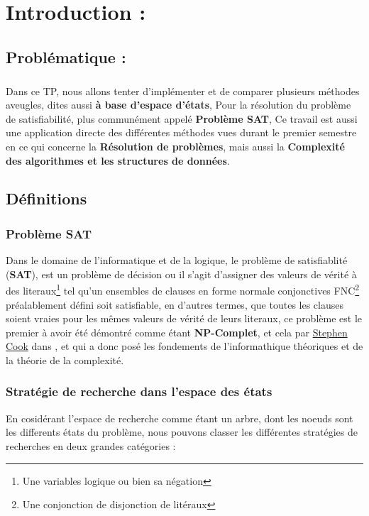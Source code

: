 \documentclass[12pt]{report}
\begin{document}
 
\tableofcontents

\newpage
\chapter{Introduction : }
\section{Problématique : }
\paragraph{}
Dans ce TP, nous allons tenter d'implémenter et de comparer plusieurs méthodes aveugles, dites aussi \textbf{à base d'espace d'états}, Pour la résolution du problème de satisfiabilité, plus communément appelé \textbf{Problème SAT}, Ce travail est aussi une application directe des différentes méthodes vues durant le premier semestre en ce qui concerne la \textbf{Résolution de problèmes}, mais aussi la \textbf{Complexité des algorithmes et les structures de données}.
\section{Définitions}
\subsection{Problème SAT}
Dans le domaine de l'informatique et de la logique, le problème de satisfiablité (\textbf{SAT}), est un problème de décision ou il s'agit d'assigner des valeurs de vérité à des literaux\footnote{Une variables logique ou bien sa négation} tel qu'un ensembles de clauses en forme normale conjonctives FNC\footnote{Une conjonction de disjonction de litéraux} préalablement défini soit satisfiable, en d'autres termes, que toutes les clauses soient vraies pour les mêmes valeurs de vérité de leurs literaux, ce problème est le premier à avoir été démontré comme étant \textbf{NP-Complet}, et cela par \href{https://en.wikipedia.org/wiki/Stephen_Cook}{Stephen Cook} dans \cite{cook}, et qui a donc posé les fondements de l'informathique théoriques et de la théorie de la complexité.
\newpage
\subsection{Stratégie de recherche dans l'espace des états}
En cosidérant l'espace de recherche comme étant un arbre, dont les noeuds sont les differents états du problème, nous pouvons classer les différentes stratégies de recherches en deux grandes catégories :
\end{document}
